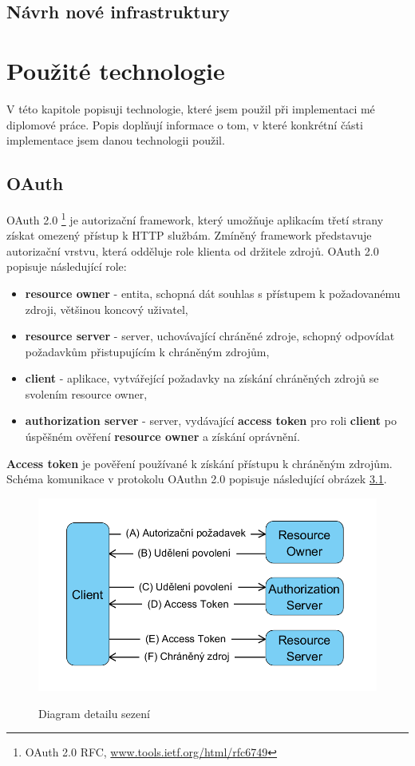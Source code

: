 \documentclass[
  printed, %
  twoside, %
  table,   %
  nolof,     %
  nolot,     %
]{fithesis3}
\begin{document}
\section{Návrh nové infrastruktury}
\chapter{Použité technologie}
V této kapitole popisuji technologie, které jsem použil při implementaci mé diplomové práce. Popis doplňují informace o tom, v které konkrétní části implementace jsem danou technologii použil.
\section{OAuth}
OAuth 2.0 \footnote{OAuth 2.0 RFC, \url{www.tools.ietf.org/html/rfc6749}} je autorizační framework, který umožňuje aplikacím třetí strany získat omezený přístup k HTTP službám. Zmíněný framework představuje autorizační vrstvu, která odděluje role klienta od držitele zdrojů. OAuth 2.0 popisuje následující role: 
\begin{itemize}
    \item \textbf{resource owner} - entita, schopná dát souhlas s přístupem k požadovanému zdroji, většinou koncový uživatel,
    \item \textbf{resource server} - server, uchovávající chráněné zdroje, schopný odpovídat požadavkům přistupujícím k chráněným zdrojům,
    \item \textbf{client} - aplikace, vytvářející požadavky na získání chráněných zdrojů se svolením resource owner,
    \item \textbf{authorization server} - server, vydávající \textbf{access token} pro roli \textbf{client} po úspěšném ověření \textbf{resource owner} a získání oprávnění.
\end{itemize}
\textbf{Access token} je pověření používané k získání přístupu k chráněným zdrojům. 
Schéma komunikace v protokolu OAuthn 2.0 popisuje následující obrázek \hyperref[fig:oauthn]{3.1}. 

\begin{figure}[H]
\caption{Diagram detailu sezení}
\centering
\includegraphics[width=12.8cm]{pics/diplomkaOauth} 
\label{fig:oauthn}
\end{figure}
\par 
\end{document}
